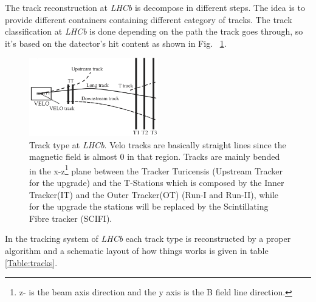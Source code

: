 \documentclass[paper=a4, fontsize=10pt]{scrartcl}
\numberwithin{equation}{section}		%
\numberwithin{figure}{section}			%
\numberwithin{table}{section}				%
\begin{document}
\begin{itemize}
{{\end{itemize}

The track reconstruction at \textit{LHCb} is decompose in different steps. The idea is to provide different containers containing different category of tracks. The track classification at \textit{LHCb} is done depending on the path the track goes through, so it's based on the datector's hit content as shown in Fig. ~\ref{figure:Tracks}.
\begin{figure}[h]
  \begin{center}
    \includegraphics[width=0.5\textwidth]{Images/tracktype.png} 
  \caption{Track type at \textit{LHCb}. Velo tracks are basically straight lines since the magnetic field is almost 0 in that region. Tracks are mainly bended in the x-z\footnote{z- is the beam axis direction and the y axis is the B field line direction.} plane between the Tracker Turicensis (Upstream Tracker for the upgrade) and the T-Stations which is composed by the Inner Tracker(IT) and the Outer Tracker(OT) (Run-I and Run-II), while for the upgrade the stations will be replaced by the Scintillating Fibre tracker (SCIFI).}
  \label{figure:Tracks}
  \end{center}
\end{figure}
In the tracking system of \textit{LHCb} each track type is reconstructed by a proper algorithm and a schematic layout of how things works is given in table \ref{Table:tracks}.
\end{document}
